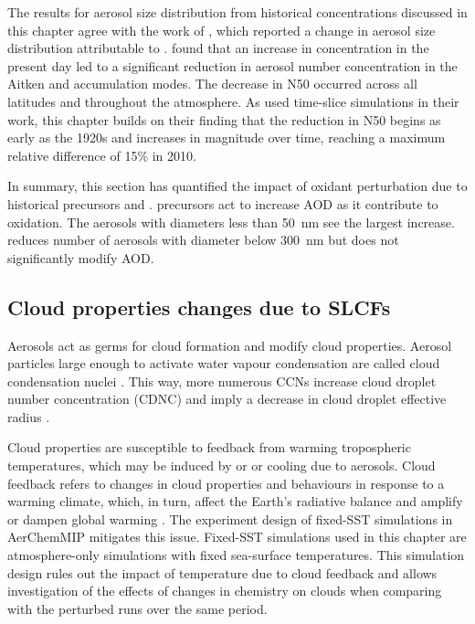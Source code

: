 The results for aerosol size distribution from historical  concentrations discussed in this chapter agree with the work of \citet{oconnorApportionmentPreIndustrial2022}, which reported a change in aerosol size distribution attributable to . \citet{oconnorApportionmentPreIndustrial2022} found that an increase in  concentration in the present day led to a significant reduction in aerosol number concentration in the Aitken and accumulation modes. The decrease in N50 occurred across all latitudes and throughout the atmosphere. As \citet{oconnorApportionmentPreIndustrial2022} used time-slice simulations in their work, this chapter builds on their finding that the reduction in N50 begins as early as the 1920s and increases in magnitude over time, reaching a maximum relative difference of 15\% in 2010. 

In summary, this section has quantified the impact of oxidant perturbation due to historical  precursors and .  precursors act to increase AOD as it contribute to  oxidation. The aerosols with diameters less than \qty{50}{nm} see the largest increase.  reduces number of aerosols with diameter below \qty{300}{nm} but does not significantly modify AOD.


\subsection{Cloud properties changes due to SLCFs}

Aerosols act as germs for cloud formation and modify cloud properties. Aerosol particles large enough to activate water vapour condensation are called cloud condensation nuclei  \citep[CCN; ][]{aitkenDustFogsClouds1881,kohlerNucleusGrowthHygroscopic1936, bellouinBoundingGlobalAerosol2020}. This way, more numerous CCNs increase cloud droplet number concentration (CDNC) and imply a decrease in cloud droplet effective radius \citep[\Reff{}; ][]{bellouinBoundingGlobalAerosol2020}. 


Cloud properties are susceptible to feedback from warming tropospheric temperatures, which may be induced by  or  or cooling due to aerosols. Cloud feedback refers to changes in cloud properties and behaviours in response to a warming climate, which, in turn, affect the Earth's radiative balance and amplify or dampen global warming \citep{wangCompensationCloudFeedback2021, grosvenorChangeAerosoldrivenCloudfeedbackdriven2023}. The experiment design of fixed-SST simulations in AerChemMIP mitigates this issue. Fixed-SST simulations used in this chapter are atmosphere-only simulations with fixed sea-surface temperatures. This simulation design rules out the impact of temperature due to cloud feedback and allows investigation of the effects of changes in chemistry on clouds when comparing \histsst{} with the perturbed runs over the same period. 

